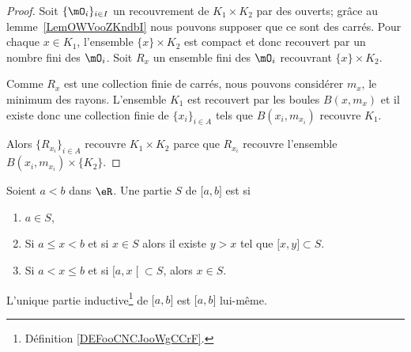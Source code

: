 \begin{proof}
	Soit \( \{ \mO_i \}_{i\in I}\) un recouvrement de \( K_1\times K_2\) par des ouverts; grâce au lemme~\ref{LemOWVooZKndbI} nous pouvons supposer que ce sont des carrés. Pour chaque \( x\in K_1\), l'ensemble \( \{ x \}\times K_2\) est compact et donc recouvert par un nombre fini des \( \mO_i\). Soit \( R_x\) un ensemble fini des \( \mO_i\) recouvrant \( \{ x \}\times K_2\).

	Comme \( R_x\) est une collection finie de carrés, nous pouvons considérer \( m_x\), le minimum des rayons. L'ensemble \( K_1\) est recouvert par les boules \( B(x,m_x)\) et il existe donc une collection finie de \( \{ x_i \}_{i\in A}\) tels que \( B(x_i,m_{x_i})\) recouvre \( K_1\).

	Alors \( \{ R_{x_i} \}_{i\in A}\) recouvre \( K_1\times K_2\) parce que \( R_{x_i}\) recouvre l'ensemble \( B(x_i,m_{x_i})\times \{ K_2 \}\).
\end{proof}

\begin{definition}  \label{DEFooCNCJooWgCCrF}
	Soient \( a<b\) dans \( \eR\). Une partie \( S\) de \( \mathopen[ a , b \mathclose]\) est  si
	\begin{enumerate}
		\item
		      \( a\in S\),
		\item
		      Si \( a\leq x<b\) et si \( x\in S\) alors il existe \( y>x\) tel que \( \mathopen[ x , y \mathclose]\subset S\).
		\item
		      Si \( a<x\leq b\) et si \( \mathopen[ a , x \mathclose[\subset S\), alors \( x\in S\).
	\end{enumerate}
\end{definition}

\begin{proposition}       \label{PROPooQVQKooIjWBrk}
	L'unique partie inductive\footnote{Définition \ref{DEFooCNCJooWgCCrF}.} de \( \mathopen[ a , b \mathclose]\) est \( \mathopen[ a , b \mathclose]\) lui-même.
\end{proposition}

